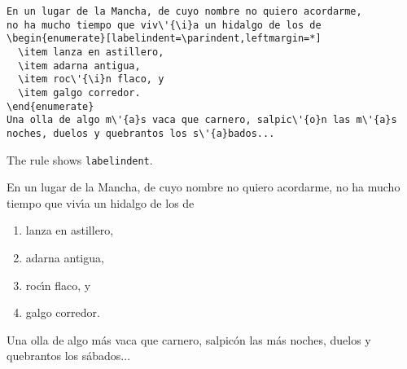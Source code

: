 \documentclass[a4paper]{ltxguide}
\newcommand\3{\unskip\enspace\fbox{\fontsize{4}{4}\selectfont NEW 3.0}}
\begin{document}
\newsample

\begin{verbatim}
En un lugar de la Mancha, de cuyo nombre no quiero acordarme,
no ha mucho tiempo que viv\'{\i}a un hidalgo de los de
\begin{enumerate}[labelindent=\parindent,leftmargin=*]
  \item lanza en astillero,
  \item adarna antigua,
  \item roc\'{\i}n flaco, y
  \item galgo corredor.
\end{enumerate}
Una olla de algo m\'{a}s vaca que carnero, salpic\'{o}n las m\'{a}s
noches, duelos y quebrantos los s\'{a}bados...
\end{verbatim}

The rule shows \verb|labelindent|. 

\samplesep

\showsep En un lugar de la Mancha, de cuyo nombre no quiero acordarme,
no ha mucho tiempo que viv\'{\i}a un hidalgo de los de
\begin{enumerate}[labelindent=\parindent,leftmargin=*]
\item lanza en astillero,
\item adarna antigua,
\item roc\'{\i}n flaco, y
\item galgo corredor.
\end{enumerate}
Una olla de algo m\'{a}s vaca que carnero, salpic\'{o}n las m\'{a}s
noches, duelos y quebrantos los s\'{a}bados...

\newsample
\end{document}
